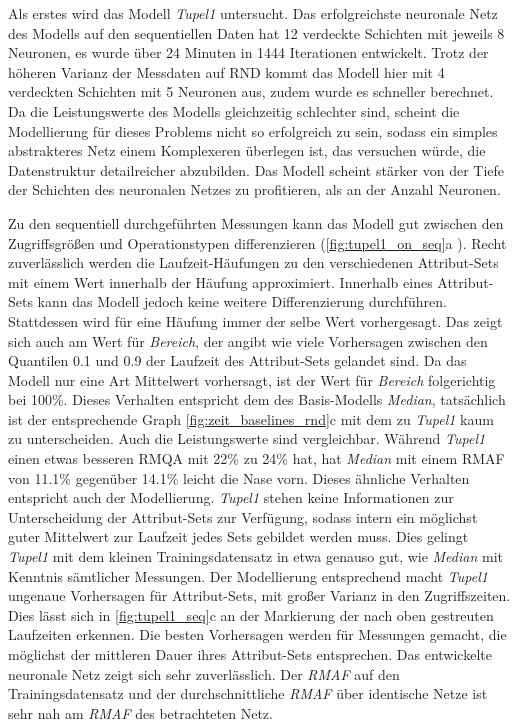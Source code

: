\documentclass[
	12pt,
	a4paper,
	BCOR10mm,
	DIV14,
	listof=totoc,
	bibliography=totoc,
	headsepline
]{scrreprt}
\begin{document}
Als erstes wird das Modell \textit{Tupel1} untersucht. 
Das erfolgreichste neuronale Netz des Modells auf den sequentiellen Daten hat 12 verdeckte Schichten mit jeweils 8 Neuronen, es wurde über 24 Minuten in 1444 Iterationen entwickelt.
Trotz der höheren Varianz der Messdaten auf RND kommt das Modell hier mit 4 verdeckten Schichten mit 5 Neuronen aus, zudem wurde es schneller berechnet. Da die Leistungswerte des Modells gleichzeitig schlechter sind, scheint die Modellierung für dieses Problems nicht so erfolgreich zu sein, sodass ein simples abstrakteres Netz einem Komplexeren überlegen ist, das versuchen würde, die Datenstruktur detailreicher abzubilden.
Das Modell scheint stärker von der Tiefe der Schichten des neuronalen Netzes zu profitieren, als an der Anzahl Neuronen. 

Zu den sequentiell durchgeführten Messungen kann das Modell gut zwischen den Zugriffsgrößen und Operationstypen differenzieren (\ref{fig:tupel1_on_seq}a ). Recht zuverlässlich werden die Laufzeit-Häufungen zu den verschiedenen Attribut-Sets mit einem Wert innerhalb der Häufung approximiert.
Innerhalb eines Attribut-Sets kann das Modell jedoch keine weitere Differenzierung durchführen.
Stattdessen wird für eine Häufung immer der selbe Wert vorhergesagt.
Das zeigt sich auch am Wert für \textit{Bereich}, der angibt wie viele Vorhersagen zwischen den Quantilen 0.1 und 0.9 der Laufzeit des Attribut-Sets gelandet sind. Da das Modell nur eine Art Mittelwert vorhersagt, ist der Wert für \textit{Bereich} folgerichtig bei 100\%.
Dieses Verhalten entspricht dem des Basis-Modells \textit{Median}, tatsächlich ist der entsprechende Graph \ref{fig:zeit_baselines_rnd}c mit dem zu \textit{Tupel1} kaum zu unterscheiden.
Auch die Leistungswerte sind vergleichbar. Während \textit{Tupel1} einen etwas besseren RMQA mit 22\% zu 24\% hat, hat \textit{Median} mit einem RMAF von 11.1\% gegenüber 14.1\% leicht die Nase vorn. 
Dieses ähnliche Verhalten entspricht auch der Modellierung. \textit{Tupel1} stehen keine Informationen zur Unterscheidung der Attribut-Sets zur Verfügung, sodass intern ein möglichst guter Mittelwert zur Laufzeit jedes Sets gebildet werden muss. Dies gelingt \textit{Tupel1} mit dem kleinen Trainingsdatensatz in etwa genauso gut, wie \textit{Median} mit Kenntnis sämtlicher Messungen.
Der Modellierung entsprechend macht \textit{Tupel1} ungenaue Vorhersagen für Attribut-Sets, mit
großer Varianz in den Zugriffszeiten. 
Dies lässt sich in \ref{fig:tupel1_seq}c an der Markierung der nach oben gestreuten Laufzeiten erkennen.
Die besten Vorhersagen werden für Messungen gemacht, die möglichst der mittleren Dauer ihres Attribut-Sets entsprechen.
Das entwickelte neuronale Netz zeigt sich sehr zuverlässlich. Der \textit{RMAF} auf den Trainingsdatensatz und der durchschnittliche \textit{RMAF} über identische Netze ist sehr nah am \textit{RMAF} des betrachteten Netz.
\end{document}
